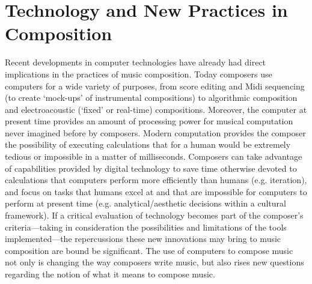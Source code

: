 \section{Technology and New Practices in Composition}

Recent developments in computer technologies have already had direct implications in the practices of music composition. Today composers use computers for a wide variety of purposes, from score editing and Midi sequencing (to create `mock-ups' of instrumental compositions) to algorithmic composition and electroacoustic (`fixed' or real-time) compositions. Moreover, the computer at present time provides an amount of processing power for musical computation never imagined before by composers. Modern computation provides the composer the possibility of executing calculations that for a human would be extremely tedious or impossible in a matter of milliseconds. Composers can take advantage of capabilities provided by digital technology to save time otherwise devoted to calculations that computers perform more efficiently than humans (e.g. iteration), and focus on tasks that humans excel at and that are impossible for computers to perform at present time (e.g. analytical/aesthetic decisions  within a cultural framework). If a critical evaluation of technology becomes part of the composer's criteria---taking in consideration the possibilities and limitations of the tools implemented---the repercussions these new innovations may bring to music composition are bound be significant. The use of computers to compose music not only is changing the way composers write music, but also rises new questions regarding the notion of what it means to compose music.

